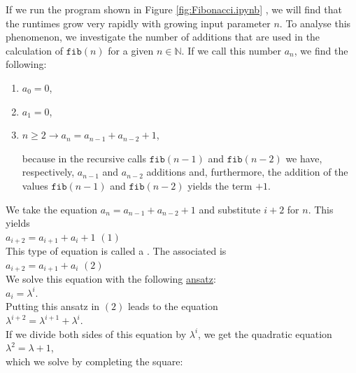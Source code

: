 If we run the program shown in Figure \ref{fig:Fibonacci.ipynb} , we will find that the runtimes grow very rapidly with
growing input parameter $n$.  To analyse this phenomenon, we investigate the number of additions that are used in the
calculation of $\texttt{fib}(n)$ for a given $n \in \mathbb{N}$.  If we call this number $a_n$, we find
the following:
\begin{enumerate}
\item $a_0 = 0$,
\item $a_1 = 0$,
\item $n \geq 2 \rightarrow a_n = a_{n-1} + a_{n-2} + 1$,

      because in the recursive calls $\texttt{fib}(n-1)$ and $\texttt{fib}(n-2)$ we have, respectively, 
      $a_{n-1}$ and $a_{n-2}$ additions and, furthermore, the addition of the values
      $\texttt{fib}(n-1)$ and $\texttt{fib}(n-2)$ yields the term $+1$.
\end{enumerate}
We take the equation $a_n = a_{n-1} + a_{n-2} + 1$ and substitute $i+2$ for $n$.  This yields
\\[0.2cm]
\hspace*{1.3cm} $a_{i+2} = a_{i+1} + a_i + 1$ \hspace*{\fill} $(1)$
\\[0.2cm]
This type of equation is called a .
The associated  is
\\[0.2cm]
\hspace*{1.3cm}
$a_{i+2} = a_{i+1} + a_i$ \hspace*{\fill} $(2)$
\\[0.2cm]
We solve this equation with the following \href{https://en.oxforddictionaries.com/definition/ansatz}{ansatz}:
\\[0.2cm]
\hspace*{1.3cm} $a_i = \lambda^i$. \\[0.2cm]
Putting this ansatz in $(2)$ leads to the equation 
\\[0.2cm]
\hspace*{1.3cm}
$\lambda^{i+2} = \lambda^{i+1} + \lambda^i$.
\\[0.2cm]
If we divide both sides of this equation by $\lambda^i$, we get the
quadratic equation
\\[0.2cm]
\hspace*{1.3cm}
$\lambda^2 = \lambda + 1$,
\\[0.2cm]
which we solve by completing the square:
\\[0.2cm]
